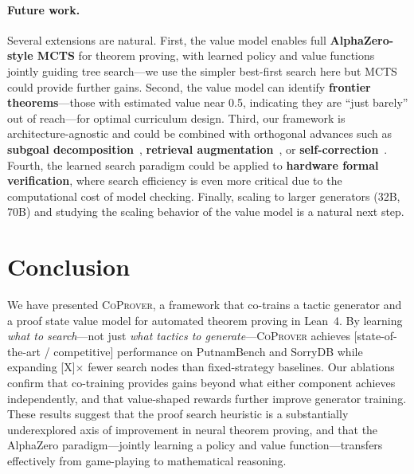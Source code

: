 \documentclass{article}
\newcommand{\coprover}{\textsc{CoProver}}
\begin{document}
\paragraph{Future work.}
Several extensions are natural. First, the value model enables full \textbf{AlphaZero-style MCTS} for theorem proving, with learned policy and value functions jointly guiding tree search---we use the simpler best-first search here but MCTS could provide further gains. Second, the value model can identify \textbf{frontier theorems}---those with estimated value near 0.5, indicating they are ``just barely'' out of reach---for optimal curriculum design. Third, our framework is architecture-agnostic and could be combined with orthogonal advances such as \textbf{subgoal decomposition}~\citep{ren2025deepseekv2}, \textbf{retrieval augmentation}~\citep{yang2023leandojo}, or \textbf{self-correction}~\citep{lin2025goedelv2}. Fourth, the learned search paradigm could be applied to \textbf{hardware formal verification}, where search efficiency is even more critical due to the computational cost of model checking. Finally, scaling to larger generators (32B, 70B) and studying the scaling behavior of the value model is a natural next step.

\section{Conclusion}
\label{sec:conclusion}

We have presented \coprover{}, a framework that co-trains a tactic generator and a proof state value model for automated theorem proving in Lean~4. By learning \emph{what to search}---not just \emph{what tactics to generate}---\coprover{} achieves [state-of-the-art / competitive] performance on PutnamBench and SorryDB while expanding [X]$\times$ fewer search nodes than fixed-strategy baselines. Our ablations confirm that co-training provides gains beyond what either component achieves independently, and that value-shaped rewards further improve generator training. These results suggest that the proof search heuristic is a substantially underexplored axis of improvement in neural theorem proving, and that the AlphaZero paradigm---jointly learning a policy and value function---transfers effectively from game-playing to mathematical reasoning.

\end{document}
